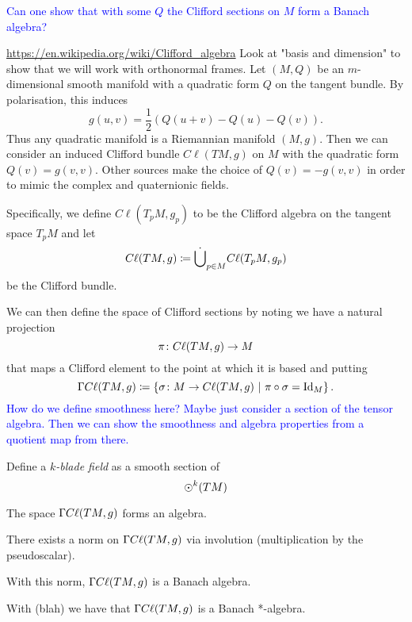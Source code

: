 \textcolor{blue}{Can one show that with some $Q$ the Clifford sections on $M$ form a Banach algebra?}

\url{https://en.wikipedia.org/wiki/Clifford_algebra} Look at "basis and dimension" to show that we will work with orthonormal frames.
Let $(M,Q)$ be an $m$-dimensional smooth manifold with a quadratic form $Q$ on the tangent bundle.  By polarisation, this induces 
\[
g(u,v)=\frac{1}{2}(Q(u+v)-Q(u)-Q(v)).
\]
Thus any quadratic manifold is a Riemannian manifold $(M,g)$.  Then we can consider an induced Clifford bundle $C\ell(TM,g)$ on $M$ with the quadratic form $Q(v)=g(v,v)$. Other sources make the choice of $Q(v)=-g(v,v)$ in order to mimic the complex and quaternionic fields.  

Specifically, we define $C\ell(T_pM,g_p)$ to be the Clifford algebra on the tangent space $T_pM$ and let
\[
C\ell(TM,g) \coloneqq \dot{\bigcup}_{p\in M} C\ell (T_pM,g_p)
\]
be the Clifford bundle.

We can then define the space of Clifford sections by noting we have a natural projection
\[
\pi \colon C\ell(TM,g) \to M
\]
that maps a Clifford element to the point at which it is based and putting
\[
\Gamma C\ell(TM,g) \coloneqq \left\{ \sigma \colon M \to C\ell(TM,g) ~\vert~ \pi \circ \sigma = \mathrm{Id}_M\right\}.
\]
\textcolor{blue}{How do we define smoothness here? Maybe just consider a section of the tensor algebra.  Then we can show the smoothness and algebra properties from a quotient map from there.}

\begin{definition}
Define a \emph{$k$-blade field} as a smooth section of
\[
\Large{\odot}^k(TM)
\]
\end{definition}

\begin{proposition}
The space $\Gamma C\ell (TM,g)$ forms an algebra.
\end{proposition}

\begin{proposition}
There exists a norm on $\Gamma C\ell (TM,g)$ via involution (multiplication by the pseudoscalar).
\end{proposition}

\begin{proposition}
With this norm, $\Gamma C\ell (TM,g)$ is a Banach algebra.
\end{proposition}

\begin{proposition}
With (blah) we have that $\Gamma C\ell (TM,g)$ is a Banach *-algebra.
\end{proposition}


